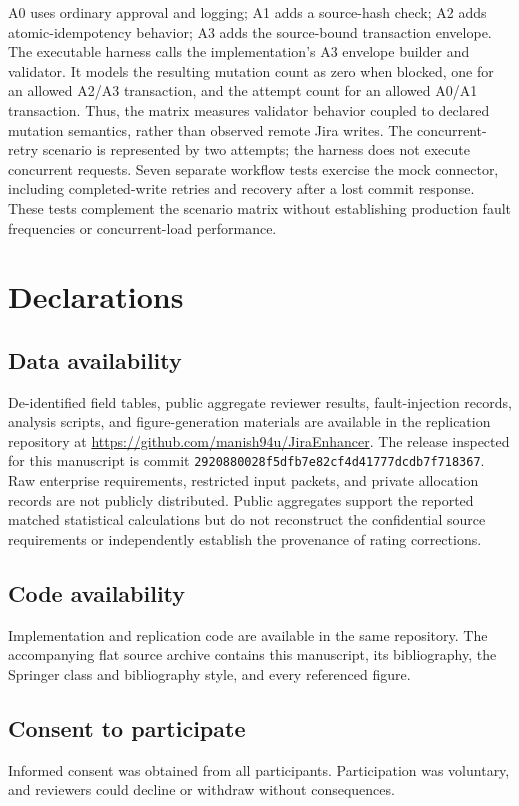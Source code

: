 \documentclass[pdflatex,sn-basic]{sn-jnl}
\begin{document}
A0 uses ordinary approval and logging; A1 adds a source-hash check; A2 adds atomic-idempotency behavior; A3 adds the source-bound transaction envelope. The executable harness calls the implementation's A3 envelope builder and validator. It models the resulting mutation count as zero when blocked, one for an allowed A2/A3 transaction, and the attempt count for an allowed A0/A1 transaction. Thus, the matrix measures validator behavior coupled to declared mutation semantics, rather than observed remote Jira writes. The concurrent-retry scenario is represented by two attempts; the harness does not execute concurrent requests. Seven separate workflow tests exercise the mock connector, including completed-write retries and recovery after a lost commit response. These tests complement the scenario matrix without establishing production fault frequencies or concurrent-load performance.

\backmatter
\section*{Declarations}
\subsection*{Data availability}
De-identified field tables, public aggregate reviewer results, fault-injection records, analysis scripts, and figure-generation materials are available in the replication repository at \url{https://github.com/manish94u/JiraEnhancer}. The release inspected for this manuscript is commit \texttt{2920880028f5dfb7e82cf4d41777dcdb7f718367}. Raw enterprise requirements, restricted input packets, and private allocation records are not publicly distributed. Public aggregates support the reported matched statistical calculations but do not reconstruct the confidential source requirements or independently establish the provenance of rating corrections.
\subsection*{Code availability}
Implementation and replication code are available in the same repository. The accompanying flat source archive contains this manuscript, its bibliography, the Springer class and bibliography style, and every referenced figure.
\subsection*{Consent to participate}
Informed consent was obtained from all participants. Participation was voluntary, and reviewers could decline or withdraw without consequences.
\end{document}
